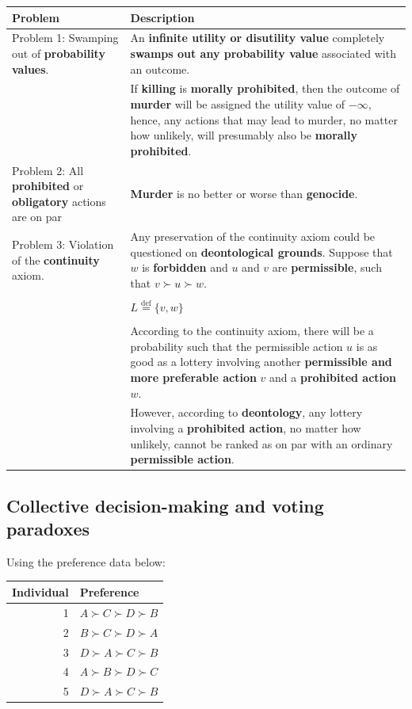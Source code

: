 \documentclass[11pt]{article}
\newcommand{\defequal}{\stackrel{\scriptscriptstyle\mathrm{def}}{=}}
\begin{document}
\begin{center}
\begin{tabular}{|m{8em}|m{30em}|}
\hline
Problem & Description\\
\hline
Problem 1: Swamping out of \textbf{probability values}. & An \textbf{infinite utility or disutility value} completely \textbf{swamps out any probability value} associated with an outcome.\\
 & If \textbf{killing} is \textbf{morally prohibited}, then the outcome of \textbf{murder} will be assigned the utility value of \(-\infty\), hence, any actions that may lead to murder, no matter how unlikely, will presumably also be \textbf{morally prohibited}.\\
\hline
Problem 2: All \textbf{prohibited} or \textbf{obligatory} actions are on par & \textbf{Murder} is no better or worse than \textbf{genocide}.\\
\hline
Problem 3: Violation of the \textbf{continuity} axiom. & Any preservation of the continuity axiom could be questioned on \textbf{deontological grounds}. Suppose that \(w\) is \textbf{forbidden} and \(u\) and \(v\) are \textbf{permissible}, such that \(v \succ u \succ w\).\\
 & \\
 & \(L \defequal \{v, w\}\)\\
 & \\
 & According to the continuity axiom, there will be a probability such that the permissible action \(u\) is as good as a lottery involving another \textbf{permissible and more preferable action} \(v\) and a \textbf{prohibited action} \(w\).\\
 & However, according to \textbf{deontology}, any lottery involving a \textbf{prohibited action}, no matter how unlikely, cannot be ranked as on par with an ordinary \textbf{permissible action}.\\
\hline
\end{tabular}
\end{center}
 \newpage
\subsection{Collective decision-making and voting paradoxes}
\label{sec:org3aa7244}
Using the preference data below:
\begin{center}
\begin{tabular}{r|l}
Individual & Preference\\
\hline
1 & \(A \succ C \succ D \succ B\)\\
2 & \(B \succ C \succ D \succ A\)\\
3 & \(D \succ A \succ C \succ B\)\\
4 & \(A \succ B \succ D \succ C\)\\
5 & \(D \succ A \succ C \succ B\)\\
\end{tabular}
\end{center}
\end{document}
